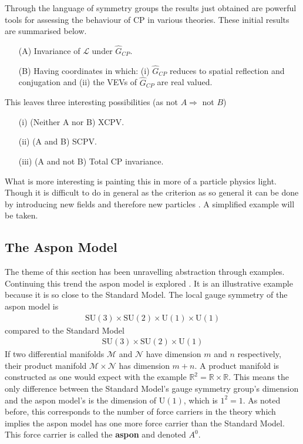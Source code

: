 Through the language of symmetry groups the results just obtained are powerful tools for assessing the behaviour of CP in various theories. These initial results are summarised below.
\begin{itemize}
\item[(A)] Invariance of $\mathcal{L}$ under $\hat{G}_{CP}$.
\item[(B)] Having coordinates in which: (i) $\hat{G}_{CP}$ reduces to spatial reflection and conjugation and (ii) the VEVs of $\hat{G}_{CP}$ are real valued.
\end{itemize}
This leaves three interesting possibilities (as not $A \Rightarrow$ not $B$)
\begin{itemize}
\item[(i)] (Neither A nor B) XCPV.
\item[(ii)] (A and B) SCPV.
\item[(iii)] (A and not B) Total CP invariance.
\end{itemize}
What is more interesting is painting this in more of a particle physics light. Though it is difficult to do in general as the criterion as so general it can be done by introducing new fields and therefore new particles \cite{SCPV5}. A simplified example will be taken.\\

\subsection{The Aspon Model}

The theme of this section has been unravelling abstraction through examples. Continuing this trend the aspon model is explored \cite{SCPV7}. It is an illustrative example because it is so close to the Standard Model. The local gauge symmetry of the aspon model is
\begin{align*}
\mathrm{SU}(3) \times \mathrm{SU}(2) \times \mathrm{U}(1) \times \mathrm{U}(1)
\end{align*}
compared to the Standard Model
\begin{align*}
\mathrm{SU}(3) \times \mathrm{SU}(2) \times \mathrm{U}(1)
\end{align*}
If two differential manifolds $\mathcal{M}$ and $\mathcal{N}$ have dimension $m$ and $n$ respectively, their product manifold $\mathcal{M} \times \mathcal{N}$ has dimension $m+n$. A product manifold is constructed as one would expect with the example $\mathbb{R}^2 = \mathbb{R}\times \mathbb{R}$. This means the only difference between the Standard Model's gauge symmetry group's dimension and the aspon model's is the dimension of $\mathrm{U}(1)$, which is $1^2=1$. As noted before, this corresponds to the number of force carriers in the theory which implies the aspon model has one more force carrier than the Standard Model. This force carrier is called the \textbf{aspon} and denoted $A^0$.

